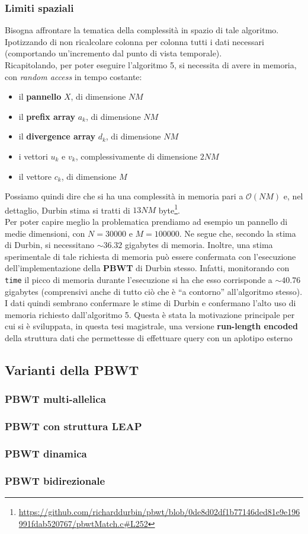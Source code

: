 \subsubsection{Limiti spaziali}
Bisogna affrontare la tematica della complessità in spazio di tale
algoritmo. Ipotizzando di non ricalcolare colonna per colonna tutti i dati
necessari (comportando un'incremento dal punto di vista temporale).\\
Ricapitolando, per poter eseguire l'algoritmo 5, si necessita di avere in
memoria, con \textit{random access} in tempo costante:
\begin{itemize}
  \item il \textbf{pannello} $X$, di dimensione $NM$
  \item il \textbf{prefix array} $a_k$, di dimensione $NM$
  \item il \textbf{divergence array} $d_k$, di dimensione $NM$
  \item i vettori $u_k$ e $v_k$, complessivamente di dimensione $2NM$
  \item il vettore $c_k$, di dimensione $M$
\end{itemize}
Possiamo quindi dire che si ha una complessità in memoria pari a
$\mathcal{O}(NM)$ e, nel dettaglio, Durbin stima si tratti di $13NM$
byte\footnote{\url{https://github.com/richarddurbin/pbwt/blob/0de8d02df1b77146ded81e9e196991fdab520767/pbwtMatch.c#L252}}.\\
Per poter capire meglio la problematica prendiamo ad esempio un pannello di
medie dimensioni, con $N=30000$ e $M=100000$. Ne segue che, secondo la stima di
Durbin, si necessitano $\sim 36.32$ gigabytes di memoria. Inoltre, una stima
sperimentale di tale richiesta di memoria può essere confermata con l'esecuzione
dell'implementazione della \textbf{PBWT} di Durbin stesso. Infatti, monitorando
con \texttt{time} il picco di memoria durante l'esecuzione si ha che esso
corrisponde a $\sim 40.76$ gigabytes (comprensivi anche di tutto ciò che è ``a
contorno'' all'algoritmo stesso). I dati quindi sembrano confermare le stime di
Durbin e confermano l'alto uso di memoria richiesto dall'algoritmo 5. Questa è
stata la motivazione principale per cui si è sviluppata, in questa tesi
magistrale, una versione \textbf{run-length encoded} della struttura dati che
permettesse di effettuare query con un aplotipo esterno
\subsection{Varianti della PBWT}
\subsubsection{PBWT multi-allelica}
\subsubsection{PBWT con struttura LEAP}
\subsubsection{PBWT dinamica}
\subsubsection{PBWT bidirezionale}

